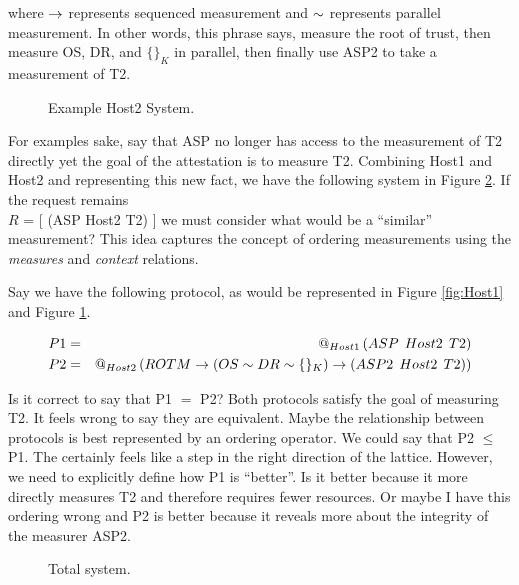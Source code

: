 \documentclass[12pt, letterpaper]{article}
\begin{document}
where $\to$ represents sequenced measurement and $\stackrel{}{\sim}$ represents parallel measurement. In other words, this phrase says, measure the root of trust, then measure OS, DR, and $\{ \}_{K}$ in parallel, then finally use ASP2 to take a measurement of T2. 


\begin{figure}[]
  \centering 
  \caption{Example Host2 System.}
  \label{fig:Host2}
\end{figure}

For examples sake, say that ASP no longer has access to the measurement of T2 directly yet the goal of the attestation is to measure T2. Combining Host1 and Host2 and representing this new fact, we have the following system in Figure \ref{fig:System1}. If the request remains \\  $R$ = [ (ASP Host2 T2) ] we must consider what would be a ``similar'' measurement? This idea captures the concept of ordering measurements using the \emph{measures} and \emph{context} relations. 


\pagebreak
Say we have the following protocol, as would be represented in Figure \ref{fig:Host1} and Figure \ref{fig:Host2}.

\begin{eqnarray*}
  P1 &=& \mathop{@_{Host1}}{(}ASP\:\: Host2\:\: T2) \\
  P2 &=& \mathop{@_{Host2}}{(ROTM \to ( OS \stackrel{}{\sim} DR \stackrel{}{\sim} \{ \}_{K} ) \to (ASP2\:\: Host2\:\: T2))}
\end{eqnarray*}

Is it correct to say that P1 $=$ P2? Both protocols satisfy the goal of measuring T2. It feels wrong to say they are equivalent. Maybe the relationship between protocols is best represented by an ordering operator. We could say that P2 $\leq$ P1. The certainly feels like a step in the right direction of the lattice. However, we need to explicitly define how P1 is ``better''. Is it better because it more directly measures T2 and therefore requires fewer resources. Or maybe I have this ordering wrong and P2 is better because it reveals more about the integrity of the measurer ASP2. 



\begin{figure}[]
  \centering 
  \caption{Total system.}
  \label{fig:System1}
\end{figure}
\end{document}
